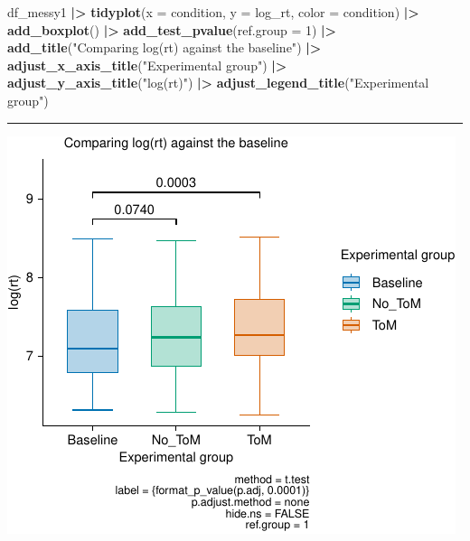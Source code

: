 \documentclass[
]{article}
\newenvironment{Shaded}{\begin{snugshade}}{\end{snugshade}}
\newcommand{\AttributeTok}[1]{\textcolor[rgb]{0.13,0.29,0.53}{#1}}
\newcommand{\DecValTok}[1]{\textcolor[rgb]{0.00,0.00,0.81}{#1}}
\newcommand{\FunctionTok}[1]{\textcolor[rgb]{0.13,0.29,0.53}{\textbf{#1}}}
\newcommand{\NormalTok}[1]{#1}
\newcommand{\SpecialCharTok}[1]{\textcolor[rgb]{0.81,0.36,0.00}{\textbf{#1}}}
\newcommand{\StringTok}[1]{\textcolor[rgb]{0.31,0.60,0.02}{#1}}
\begin{document}
\begin{Shaded}
\begin{Highlighting}[]
\NormalTok{df\_messy1 }\SpecialCharTok{|\textgreater{}} 
  \FunctionTok{tidyplot}\NormalTok{(}\AttributeTok{x =}\NormalTok{ condition, }
           \AttributeTok{y =}\NormalTok{ log\_rt, }
           \AttributeTok{color =}\NormalTok{ condition) }\SpecialCharTok{|\textgreater{}} 
  \FunctionTok{add\_boxplot}\NormalTok{() }\SpecialCharTok{|\textgreater{}} 
  \FunctionTok{add\_test\_pvalue}\NormalTok{(}\AttributeTok{ref.group =} \DecValTok{1}\NormalTok{) }\SpecialCharTok{|\textgreater{}}
  \FunctionTok{add\_title}\NormalTok{(}\StringTok{"Comparing log(rt) against the baseline"}\NormalTok{) }\SpecialCharTok{|\textgreater{}}
  \FunctionTok{adjust\_x\_axis\_title}\NormalTok{(}\StringTok{"Experimental group"}\NormalTok{) }\SpecialCharTok{|\textgreater{}}
  \FunctionTok{adjust\_y\_axis\_title}\NormalTok{(}\StringTok{"log(rt)"}\NormalTok{) }\SpecialCharTok{|\textgreater{}}
  \FunctionTok{adjust\_legend\_title}\NormalTok{(}\StringTok{"Experimental group"}\NormalTok{)}
\end{Highlighting}
\end{Shaded}

\begin{center}\rule{0.5\linewidth}{0.5pt}\end{center}

\includegraphics{L5_Checking_Assumptions_pdf_files/figure-latex/unnamed-chunk-24-1.pdf}
\end{document}

